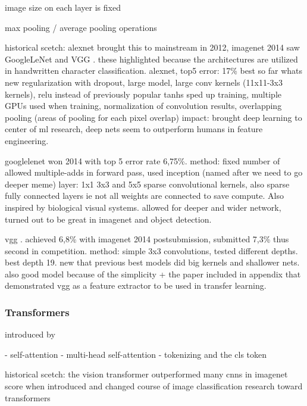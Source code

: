 \documentclass{article}
\begin{document}
image size on each layer is fixed \cite{vgg}

max pooling / average pooling operations

historical scetch: alexnet \cite{alexnet} brought this to mainstream in 2012, imagenet 2014 saw GoogleLeNet \cite{googlelenet} and VGG \cite{vgg}.
these highlighted because the architectures are utilized in handwritten character classification.
alexnet, top5 error: 17\% best so far
whats new regularization with dropout, large model, large conv kernels (11x11-3x3 kernels), relu instead of previously popular tanhs sped up training, multiple GPUs used when training, normalization of convolution results, overlapping pooling (areas of pooling for each pixel overlap)
impact: brought deep learning to center of ml research, deep nets seem to outperform humans in feature engineering.

googlelenet \cite{googlelenet} won 2014 with top 5 error rate  6,75\%.
method: fixed number of allowed multiple-adds in forward pass, 
used inception (named after we need to go deeper meme) layer: 1x1 3x3 and 5x5 sparse convolutional kernels, also 
sparse fully connected layers ie not all weights are connected 
to save compute. Also inspired by biological visual systems. allowed
for deeper and wider network, turned out to be great in imagenet and 
object detection.

vgg \cite{vgg}. achieved 6,8\% with imagenet 2014 postsubmission, submitted 7,3\% thus 
second in competition. method: simple 3x3 convolutions, tested different depths. best depth 19.
new that previous best models did big kernels and shallower nets. also good model because of 
the simplicity + the paper included in appendix that demonstrated vgg as a feature extractor to 
be used in transfer learning.

\subsubsection{Transformers}

introduced by \cite{attention_is_all_you_need}

- self-attention
- multi-head self-attention
- tokenizing and the cls token

historical scetch: the vision transformer \cite{vit} outperformed many cnns in imagenet score when introduced and changed 
course of image classification research toward transformers
\end{document}
